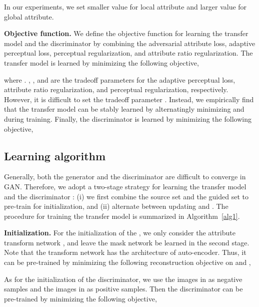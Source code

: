 \documentclass[journal]{IEEEtran}
\begin{document}
In our experiments, we set smaller  value for local attribute and larger  value for global attribute.





\textbf{Objective function.}\quad
We define the objective function for learning the transfer model  and the discriminator  by combining the adversarial attribute loss, adaptive perceptual loss, perceptual regularization, and attribute ratio regularization.
The transfer model  is learned by minimizing the following objective,

where .
, , and  are the tradeoff parameters for the adaptive perceptual loss, attribute ratio regularization, and perceptual regularization, respectively.
However, it is difficult to set the tradeoff parameter .
Instead, we empirically find that the transfer model can be stably learned by alternatingly minimizing  and  during training.
Finally, the discriminator  is learned by minimizing the following objective,








\subsection{Learning algorithm}\label{sec:learning}

Generally, both the generator and the discriminator are difficult to converge in GAN.
Therefore, we adopt a two-stage strategy for learning the transfer model  and the discriminator :
(i) we first combine the source set  and the guided set  to pre-train for initialization, and (ii) alternate between updating  and .
The procedure for training the transfer model  is summarized in Algorithm~\ref{alg1}.






\textbf{Initialization.}\quad
For the initialization of the , we only consider the attribute transform network , and leave the mask network  be learned in the second stage.
Note that the transform network  has the architecture of auto-encoder.
Thus, it can be pre-trained by minimizing the following reconstruction objective on  and ,



As for the initialization of the discriminator, we use the images in  as negative samples and the images in  as positive samples.
Then the discriminator can be pre-trained by minimizing the following objective,
\end{document}
